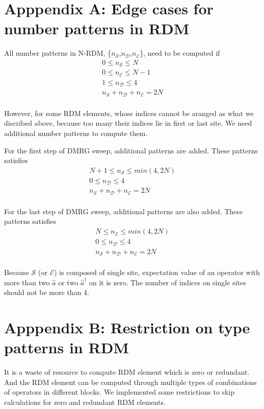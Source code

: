 \section*{Apppendix A: Edge cases for number patterns in RDM}
All number patterns in N-RDM, \{$n_\mathcal{S}$,$n_\mathcal{D}$,$n_\mathcal{E}$\}, need to be computed if 
\begin{align}
0\le n_\mathcal{S} \le N \\
0\le n_\mathcal{E} \le N-1 \\
1\le n_\mathcal{D} \le 4 \\
n_\mathcal{S} +n_\mathcal{D} +n_\mathcal{E} =2N \\
\end{align}

However, for some RDM elements, whose indices cannot be aranged as what we discribed above, because too many their indices lie in first or last site. We need additional number patterns to compute them.

For the first step of DMRG sweep, additional patterns are added. These patterns satisfies
\begin{align}
N+1\le n_\mathcal{S} \le min(4,2N) \\
0\le n_\mathcal{D} \le 4 \\
n_\mathcal{S} +n_\mathcal{D} +n_\mathcal{E} =2N \\
\end{align}

For the last step of DMRG sweep, additional patterns are also added. These patterns satisfies
\begin{align}
N\le n_\mathcal{E} \le min(4,2N) \\
0\le n_\mathcal{D} \le 4 \\
n_\mathcal{S} +n_\mathcal{D} +n_\mathcal{E} =2N \\
\end{align}

Because $\mathcal{S}$ (or $\mathcal{E}$) is composed of single site, expectation value of an operator with more than two $\hat{a}$ or two $\hat{a}^\dagger$ on it is zero. The number of indices on single sites should not be more than 4.

\section*{Apppendix B: Restriction on type patterns in RDM}
It is a waste of resource to compute RDM element which is zero or redundant. And the RDM element can be computed through multiple types of combinations of operators in different blocks. We implemented some restrictions to skip calculations for zero and redundant RDM elements.

